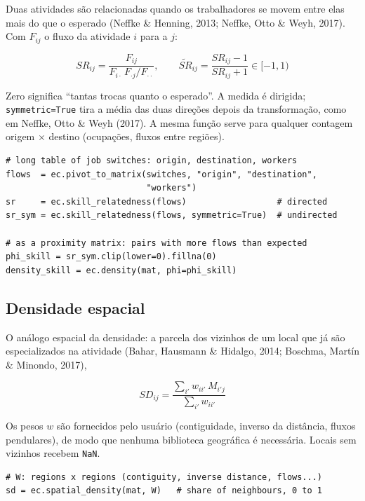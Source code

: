\documentclass[12pt, a4paper]{article}
\begin{document}
Duas atividades s\~{a}o relacionadas quando os trabalhadores se movem
entre elas mais do que o esperado (Neffke \& Henning, 2013; Neffke, Otto
\& Weyh, 2017). Com $F_{ij}$ o fluxo da atividade $i$ para a $j$:

\[
  SR_{ij} = \frac{F_{ij}}{F_{i\cdot}\,F_{\cdot j} / F_{\cdot\cdot}},
  \qquad
  \widetilde{SR}_{ij} = \frac{SR_{ij} - 1}{SR_{ij} + 1} \in [-1, 1)
\]

Zero significa ``tantas trocas quanto o esperado''. A medida \'{e}
dirigida; \texttt{symmetric=True} tira a m\'{e}dia das duas dire\c{c}\~{o}es
depois da transforma\c{c}\~{a}o, como em Neffke, Otto \& Weyh (2017). A mesma fun\c{c}\~{a}o serve para qualquer
contagem origem $\times$ destino (ocupa\c{c}\~{o}es, fluxos entre
regi\~{o}es).

\begin{lstlisting}[caption={Skill relatedness a partir de trocas de emprego}]
# long table of job switches: origin, destination, workers
flows  = ec.pivot_to_matrix(switches, "origin", "destination",
                            "workers")
sr     = ec.skill_relatedness(flows)                  # directed
sr_sym = ec.skill_relatedness(flows, symmetric=True)  # undirected

# as a proximity matrix: pairs with more flows than expected
phi_skill = sr_sym.clip(lower=0).fillna(0)
density_skill = ec.density(mat, phi=phi_skill)
\end{lstlisting}

\subsection{Densidade espacial}

O an\'{a}logo espacial da densidade: a parcela dos vizinhos de um local
que j\'{a} s\~{a}o especializados na atividade (Bahar, Hausmann \&
Hidalgo, 2014; Boschma, Mart\'{i}n \& Minondo, 2017),

\[
  SD_{ij} = \frac{\sum_{i'} w_{ii'}\,M_{i'j}}{\sum_{i'} w_{ii'}}
\]

Os pesos $w$ s\~{a}o fornecidos pelo usu\'{a}rio (contiguidade, inverso
da dist\^{a}ncia, fluxos pendulares), de modo que nenhuma biblioteca
geogr\'{a}fica \'{e} necess\'{a}ria. Locais sem vizinhos recebem
\texttt{NaN}.

\begin{lstlisting}[caption={Densidade espacial}]
# W: regions x regions (contiguity, inverse distance, flows...)
sd = ec.spatial_density(mat, W)   # share of neighbours, 0 to 1
\end{lstlisting}
\end{document}
